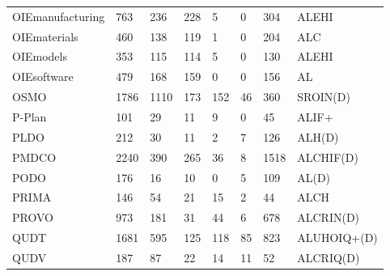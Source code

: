 \begin{table}
\begin{tabular}{m{3.5cm}m{1cm}m{1cm}m{1cm}m{1cm}m{1cm}m{1cm}m{1cm}}
OIEmanufacturing            &       763 &               236 &        228 &                    5 &                      0 &                      304 &            ALEHI \\
OIEmaterials                &       460 &               138 &        119 &                    1 &                      0 &                      204 &              ALC \\
OIEmodels                   &       353 &               115 &        114 &                    5 &                      0 &                      130 &            ALEHI \\
OIEsoftware                 &       479 &               168 &        159 &                    0 &                      0 &                      156 &               AL \\
OSMO                        &      1786 &              1110 &        173 &                  152 &                     46 &                      360 &         SROIN(D) \\
P-Plan                      &       101 &                29 &         11 &                    9 &                      0 &                       45 &            ALIF+ \\
PLDO                        &       212 &                30 &         11 &                    2 &                      7 &                      126 &           ALH(D) \\
PMDCO                       &      2240 &               390 &        265 &                   36 &                      8 &                     1518 &        ALCHIF(D) \\
PODO                        &       176 &                16 &         10 &                    0 &                      5 &                      109 &            AL(D) \\
PRIMA                       &       146 &                54 &         21 &                   15 &                      2 &                       44 &             ALCH \\
PROVO                       &       973 &               181 &         31 &                   44 &                      6 &                      678 &        ALCRIN(D) \\
QUDT                        &      1681 &               595 &        125 &                  118 &                     85 &                      823 &      ALUHOIQ+(D) \\
QUDV                        &       187 &                87 &         22 &                   14 &                     11 &                       52 &        ALCRIQ(D) \\

\end{tabular}
\end{table}
